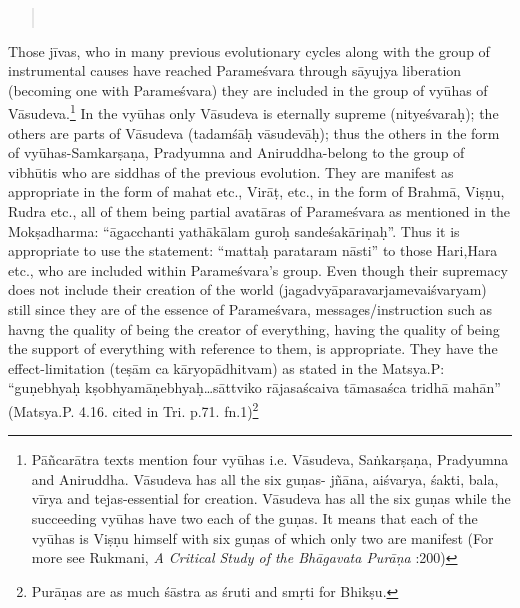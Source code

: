 \begin{verse}
\\
\end{verse}

Those jīvas, who in many previous evolutionary cycles along with the group of instrumental causes have reached Parameśvara through sāyujya liberation (becoming one with Parameśvara) they are included in the group of vyūhas of Vāsudeva.\footnote{Pāñcarātra texts mention four vyūhas i.e. Vāsudeva, Saṅkarṣaṇa, Pradyumna and Aniruddha. Vāsudeva has all the six guṇas- jñāna, aiśvarya, śakti, bala, vīrya and tejas-essential for creation. Vāsudeva has all the six guṇas while the succeeding vyūhas have two each of the guṇas. It means that each of the vyūhas is Viṣṇu himself with six guṇas of which only two are manifest (For more see Rukmani, \textit{A Critical Study of the Bhāgavata Purāṇa} :200)}  In the vyūhas only Vāsudeva is eternally supreme (nityeśvaraḥ); the others are parts of Vāsudeva (tadamśāḥ vāsudevāḥ); thus the others in the form of vyūhas-Samkarṣaṇa, Pradyumna and Aniruddha-belong to the group of vibhūtis who are siddhas of the previous evolution. They are manifest as appropriate in the form of mahat etc., Virāṭ, etc., in the form of Brahmā, Viṣṇu,  Rudra etc., all of them being partial avatāras of Parameśvara as mentioned in the Mokṣadharma: “āgacchanti yathākālam guroḥ sandeśakāriṇaḥ”. Thus it is appropriate to use the statement: “mattaḥ parataram nāsti” to those Hari,Hara etc., who are included within Parameśvara’s group. Even though their supremacy does not include their creation of the world (jagadvyāparavarjamevaiśvaryam) still since they are of the essence of Parameśvara, messages/instruction such as havng the quality of being the creator of everything, having the quality of being the support of everything with reference to them, is appropriate. They have the effect-limitation (teṣām ca kāryopādhitvam) as stated in the Matsya.P: “guṇebhyaḥ kṣobhyamāṇebhyaḥ…sāttviko rājasaścaiva tāmasaśca tridhā mahān” (Matsya.P. 4.16. cited in Tri. p.71. fn.1)\footnote{Purāṇas are as much śāstra as śruti and smṛti for Bhikṣu.} 


